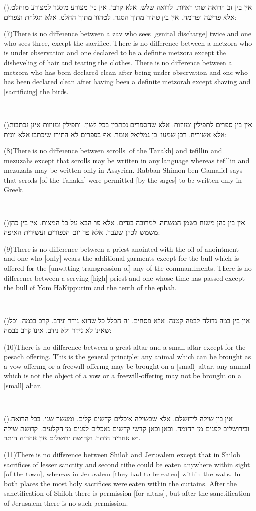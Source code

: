 \documentclass[12pt, openany]{book}
\newcommand{\sethebfont}{
\fontsize{10.5pt}{13.1pt} \selectfont
}
\newcommand{\LTRmark}{‎}
\newcommand{\hebeng}[2]{
	{\sethebfont #1}
	
	{\beginL\englishfont\sethebfont{\raggedright #2 \hfill} \LTRmark\endL}
	
	\vspace{\baselineskip}
}
\newcommand{\vsnum}[1]{(\hebrewnumeral{#1})\space}
\newcommand{\vsnumeng}[1]{(#1)\space}
\begin{document}
\hebeng{\vsnum{7}אין בין זב הרואה שתי ראיות. לרואה שלש. אלא קרבן. אין בין מצורע מוסגר למצורע מוחלט. אלא פריעה ופרימה. אין בין טהור מתוך הסגר. לטהור מתוך החלט. אלא תגלחת וצפרים: 
}{\vsnumeng{7}There is no difference between a zav who sees {[genital discharge]} twice and one who sees three, except the sacrifice. There is no difference between a metzora who is under observation and one declared to be a definite metzora except the disheveling of hair and tearing the clothes. There is no difference between a metzora who has been declared clean after being under observation and one who has been declared clean after having been a definite metzorah except shaving and {[sacrificing]} the birds.}%

\hebeng{\vsnum{8}אין בין ספרים לתפילין ומזוזות. אלא שהספרים נכתבין בכל לשון. ותפילין ומזוזות אינן נכתבות אלא אשורית. רבן שמעון בן גמליאל אומר. אף בספרים לא התירו שיכתבו אלא יונית: 
}{\vsnumeng{8}There is no difference between scrolls {[of the Tanakh]} and tefillin and mezuzahs except that scrolls may be written in any language whereas tefillin and mezuzahs may be written only in Assyrian. Rabban Shimon ben Gamaliel says that scrolls {[of the Tanakh]} were permitted {[by the sages]} to be written only in Greek.}%

\hebeng{\vsnum{9}אין בין כהן משוח בשמן המשחה. למרובה בגדים. אלא פר הבא על כל המצות. אין בין כהן משמש לכהן שעבר. אלא פר יום הכפורים ועשירית האיפה: 
}{\vsnumeng{9}There is no difference between a priest anointed with the oil of anointment and one who {[only]} wears the additional garments except for the bull which is offered for the {[unwitting transgression of]} any of the commandments. There is no difference between a serving {[high]} priest and one whose time has passed except the bull of Yom HaKippurim and the tenth of the ephah.}%

\hebeng{\vsnum{10}אין בין במה גדולה לבמה קטנה. אלא פסחים. זה הכלל כל שהוא נידר ונידב. קרב בבמה. וכל שאינו לא נידר ולא נידב. אינו קרב בבמה: 
}{\vsnumeng{10}There is no difference between a great altar and a small altar except for the pesach offering. This is the general principle: any animal which can be brought as a vow-offering or a freewill offering may be brought on a {[small]} altar, any animal which is not the object of a vow or a freewill-offering may not be brought on a {[small]} altar.}%

\hebeng{\vsnum{11}אין בין שילה לירושלם. אלא שבשילה אוכלים קדשים קלים. ומעשר שני. בכל הרואה. ובירושלים לפנים מן החומה. וכאן וכאן קדשי קדשים נאכלים לפנים מן הקלעים. קדושת שילה יש אחריה היתר. וקדושת ירושלים אין אחריה היתר: 
}{\vsnumeng{11}There is no difference between Shiloh and Jerusalem except that in Shiloh sacrifices of lesser sanctity and second tithe could be eaten anywhere within sight {[of the town]}, whereas in Jerusalem {[they had to be eaten]} within the walls. In both places the most holy sacrifices were eaten within the curtains. After the sanctification of Shiloh there is permission {[for altars]}, but after the sanctification of Jerusalem there is no such permission.}%
\end{document}

